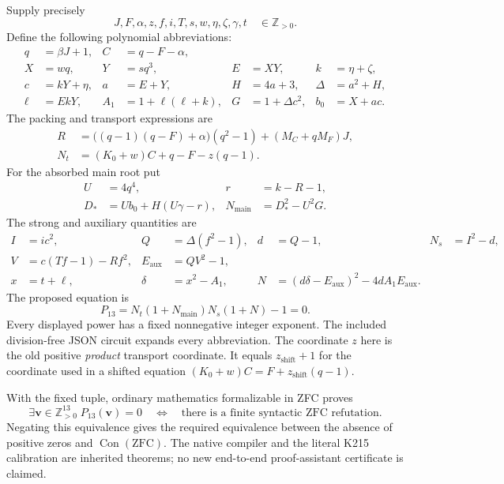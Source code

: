 Supply precisely
\[
 J,F,\alpha,z,f,i,T,s,w,\eta,\zeta,\gamma,t
 \quad\in\mathbb Z_{>0}.
\]
Define the following polynomial abbreviations:
\begin{align*}
 q&=\beta J+1,& C&=q-F-\alpha,\\
 X&=wq,&Y&=sq^3,&E&=XY,& k&=\eta+\zeta,\\
 c&=kY+\eta,&a&=E+Y,&H&=4a+3,&\Delta&=a^2+H,\\
 \ell&=EkY,& A_1&=1+\ell(\ell+k),&G&=1+\Delta c^2,&b_0&=X+ac.
\end{align*}
The packing and transport expressions are
\begin{align*}
 R&=\bigl((q-1)(q-F)+\alpha\bigr)(q^2-1)
       +(M_C+qM_F)J,\\
 N_t&=(K_0+w)C+q-F-z(q-1).
\end{align*}
For the absorbed main root put
\begin{align*}
 U&=4q^4,& r&=k-R-1,\\
 D_*&=Ub_0+H(U\gamma-r),&
 N_{\mathrm{main}}&=D_*^2-U^2G.
\end{align*}
The strong and auxiliary quantities are
\begin{align*}
 I&=ic^2,&Q&=\Delta(f^2-1),&d&=Q-1,&N_s&=I^2-d,\\
 V&=c(Tf-1)-Rf^2,&E_{\mathrm{aux}}&=QV^2-1,\\
 x&=t+\ell,&\delta&=x^2-A_1,&
 N&=(d\delta-E_{\mathrm{aux}})^2-4dA_1E_{\mathrm{aux}}.
\end{align*}
The proposed equation is
\begin{equation}
 \boxed{\displaystyle
 P_{13}=N_t(1+N_{\mathrm{main}})N_s(1+N)-1=0.}
 \label{eq:p13-main}
\end{equation}
Every displayed power has a fixed nonnegative integer exponent.
The included division-free JSON circuit expands every abbreviation.
The coordinate $z$ here is the old positive \emph{product} transport
coordinate. It equals $z_{\mathrm{shift}}+1$ for the coordinate used in a
shifted equation $(K_0+w)C=F+z_{\mathrm{shift}}(q-1)$.

With the fixed tuple, ordinary mathematics formalizable in ZFC proves
\[
 \exists\boldsymbol v\in\mathbb Z_{>0}^{13}\;
 P_{13}(\boldsymbol v)=0
 \quad\Longleftrightarrow\quad
 \text{there is a finite syntactic ZFC refutation}.
\]
Negating this equivalence gives the required equivalence between the
absence of positive zeros and $\operatorname{Con}(\mathrm{ZFC})$.
The native compiler and the literal K215 calibration are inherited
theorems; no new end-to-end proof-assistant certificate is claimed.

